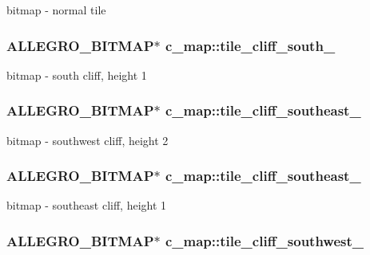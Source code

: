 bitmap -\/ normal tile \hypertarget{classc__map_ae725ccf9eb9daefefdb9b58b00388913}{
\subsubsection[{tile\-\_\-cliff\-\_\-south\-\_\-2}]{\setlength{\rightskip}{0pt plus 5cm}A\-L\-L\-E\-G\-R\-O\-\_\-\-B\-I\-T\-M\-A\-P$\ast$ c\-\_\-map\-::tile\-\_\-cliff\-\_\-south\-\_\hspace{0.3cm}{\ttfamily [protected]}}}\label{classc__map_ae725ccf9eb9daefefdb9b58b00388913}
bitmap -\/ south cliff, height 1 \hypertarget{classc__map_a9d5707e014681a6d16044d483688c081}{
\subsubsection[{tile\-\_\-cliff\-\_\-southeast\-\_\-1}]{\setlength{\rightskip}{0pt plus 5cm}A\-L\-L\-E\-G\-R\-O\-\_\-\-B\-I\-T\-M\-A\-P$\ast$ c\-\_\-map\-::tile\-\_\-cliff\-\_\-southeast\-\_\hspace{0.3cm}{\ttfamily [protected]}}}\label{classc__map_a9d5707e014681a6d16044d483688c081}
bitmap -\/ southwest cliff, height 2 \hypertarget{classc__map_a1aefdb38df373482aff57b9243ec9d67}{
\subsubsection[{tile\-\_\-cliff\-\_\-southeast\-\_\-2}]{\setlength{\rightskip}{0pt plus 5cm}A\-L\-L\-E\-G\-R\-O\-\_\-\-B\-I\-T\-M\-A\-P$\ast$ c\-\_\-map\-::tile\-\_\-cliff\-\_\-southeast\-\_\hspace{0.3cm}{\ttfamily [protected]}}}\label{classc__map_a1aefdb38df373482aff57b9243ec9d67}
bitmap -\/ southeast cliff, height 1 \hypertarget{classc__map_abecd9b0a1aab4c4e02cbe698ddb487ee}{
\subsubsection[{tile\-\_\-cliff\-\_\-southwest\-\_\-1}]{\setlength{\rightskip}{0pt plus 5cm}A\-L\-L\-E\-G\-R\-O\-\_\-\-B\-I\-T\-M\-A\-P$\ast$ c\-\_\-map\-::tile\-\_\-cliff\-\_\-southwest\-\_\hspace{0.3cm}{\ttfamily [protected]}}}\label{classc__map_abecd9b0a1aab4c4e02cbe698ddb487ee}
